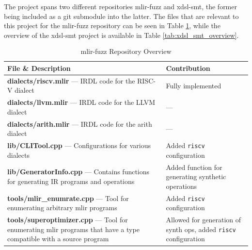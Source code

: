 The project spans two different repositories mlir-fuzz and xdsl-smt, the former being
included as a git submodule into the latter. The files that are relevant to this project
for the mlir-fuzz repository can be seen in Table \ref{tab:mlir_fuzz_overview}, while
the overview of the xdsl-smt project is available in Table \ref{tab:xdsl_smt_overview}.

\begin{table}[htbp]
\centering
\footnotesize
\caption{mlir-fuzz Repository Overview}
\begin{tabular}{p{9cm}p{6cm}}
\toprule
\textbf{File \& Description} & \textbf{Contribution} \\

\midrule
\textbf{dialects/riscv.mlir} --- IRDL code for the RISC-V dialect & Fully implemented \\
\textbf{dialects/llvm.mlir} --- IRDL code for the LLVM dialect & --- \\
\textbf{dialects/arith.mlir} --- IRDL code for the arith dialect & --- \\
\midrule
\textbf{lib/CLITool.cpp} --- Configurations for various dialects & Added \texttt{riscv} configuration \\
\textbf{lib/GeneratorInfo.cpp} --- Contains functions for generating IR programs and operations & Added function for generating synthetic operations \\
\midrule
\textbf{tools/mlir\_enumrate.cpp} --- Tool for enumerating arbitrary mlir programs & Added \texttt{riscv} configuration \\
\textbf{tools/superoptimizer.cpp} --- Tool for enumerating mlir programs that have a type compatible with a source program & Allowed for generation of synth ops, added \texttt{riscv} configuration \\

\bottomrule
\end{tabular}
\label{tab:mlir_fuzz_overview}
\end{table}

